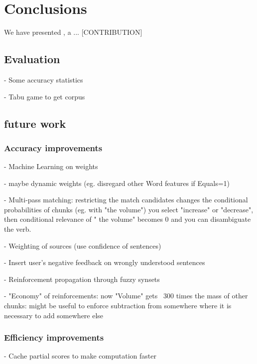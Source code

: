 
\chapter{Conclusions} %

\label{ch:conclusions} %


We have presented \pname, a ... [CONTRIBUTION]

\section{Evaluation}
 - Some accuracy statistics
 
 - Tabu game to get corpus

\section{future work}

\subsection{Accuracy improvements}
- Machine Learning on weights

- maybe dynamic weights (eg. disregard other Word features if Equals=1)

- Multi-pass matching: restricting the match candidates changes the
   conditional probabilities of chunks (eg. with "the volume") you select
   "increase" or "decrease", then conditional relevance of " the volume" becomes
   0 and you can disambiguate the verb.
   
- Weighting of sources (use confidence of sentences)

- Insert user's negative feedback on wrongly understood sentences

- Reinforcement propagation through fuzzy synsets

- "Economy" of reinforcements: now "Volume" gets ~300 times the mass of other
   chunks: might be useful to enforce subtraction from somewhere where it is
   necessary to add somewhere else 

\subsection{Efficiency improvements}
- Cache partial scores to make computation faster
 
